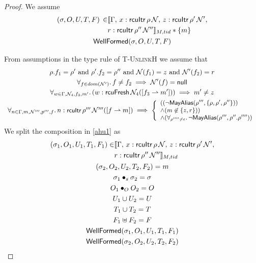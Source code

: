  \begin{proof}
We assume
\begin{gather}\label{ahu1}
  \begin{aligned}
    (\sigma, O, U, T, F) \, \in &  \llbracket \Gamma, \, x:\mathsf{rcuItr}\,\rho\,\mathcal{N} ,\, z:\mathsf{rcuItr} \, \rho' \,\mathcal{N}', \\
    &r:\mathsf{rcuItr} \, \rho'' \,\mathcal{N}'' \rrbracket_{M,tid} * \{m\}
    \end{aligned} \\
\textsf{WellFormed}(\sigma,O,U,T,F)
\label{ahu2}
\end{gather}

From assumptions in the type rule of \textsc{T-UnlinkH} we assume that
\begin{gather}
  \rho.f_1=\rho' \text{ and } \rho'.f_2=\rho'' \text{ and } \N(f_1) = z \text{ and } \N'(f_2)=r
    \label{ahu4} \\
\forall_{f\in dom(\N')} \ldotp f\neq f_2 \implies  \N'(f) = \textsf{null}
      \label{ahu5} \\
\forall_{w \in \Gamma, \N_4, f_3, m'} \ldotp (w:\textsf{rcuFresh}\,\N_4([f_3\rightharpoonup m'])) \implies m' \neq z
      \label{ahu5b} \\
\begin{array}{l}\footnotesize
\forall_{n\in \Gamma,m,\N''', p''',f}\ldotp n:\textsf{rcuItr}\,\rho'''\,\N'''([f\rightharpoonup m]) \implies %
\left\{\begin{array}{l}
((\neg\mathsf{MayAlias}(\rho''',\{\rho,\rho',\rho''\})  ) \arcr
\land (m\not\in\{z,r\} ) ) \arcr
\land (\forall_{\rho''''\neq \epsilon} \ldotp \neg\mathsf{MayAlias}(\rho''', \rho''.\rho'''') )
\end{array}\right.
\end{array}
        \label{ahu6}
\end{gather}
We split the composition in  \ref{ahu1} as 
\begin{gather} \label{ahu11}
  \begin{aligned}
    (\sigma_1, O_{1}, U_{1}, T_{1},F_1 ) \in  &\llbracket \Gamma, \, x:\mathsf{rcuItr}\,\rho\,\mathcal{N} ,\, z:\mathsf{rcuItr} \, \rho' \,\mathcal{N}',\\
    &r:\mathsf{rcuItr} \, \rho'' \,\mathcal{N}'' \rrbracket_{M,tid} \end{aligned}\\
\label{ahu12}
(\sigma_2, O_{2}, U_{2}, T_{2},F_2) = m
\\
\label{ahusig}
\sigma_1 \bullet_s \sigma_2 = \sigma \\
\label{ahu13}
O_{1} \bullet_{O} O_{2} = O
\\
\label{ahu14}
U_{1} \cup U_{2} = U
\\
\label{ahu15}
T_{1} \cup T_{2} = T
\\
\label{ahff}
F_{1} \uplus F_2 = F
\\
\label{ahu16}
\textsf{WellFormed}(\sigma_1,O_{1},U_{1},T_{1},F_1)
\\
\label{ahu17}
\textsf{WellFormed}(\sigma_2,O_{2},U_{2},T_{2},F_2)
\end{gather}


\end{proof}
